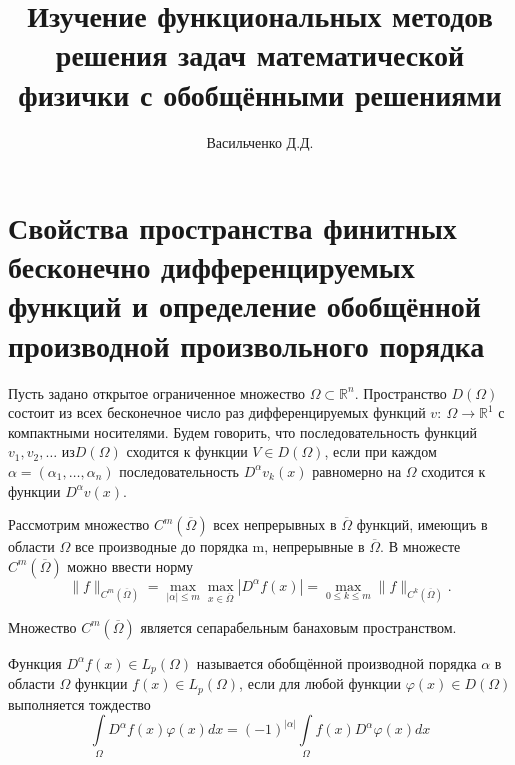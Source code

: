 \documentclass[9pt]{article}
\title{Изучение функциональных методов решения задач математической физички с обобщёнными решениями}
\author{Васильченко Д.Д.}
\date{}
\begin{document}
	\maketitle
	\section{Свойства пространства финитных бесконечно дифференцируемых функций и определение обобщённой производной произвольного порядка}
	
	Пусть задано открытое ограниченное множество $\Omega \subset \mathbb{R}^n$. Пространство $D(\Omega)$ состоит из всех бесконечное число раз дифференцируемых функций $v: \ \Omega \to \mathbb{R}^1$ с компактными носителями. Будем говорить, что последовательность функций $v_1, v_2, \dots$ из$D(\Omega)$ сходится к функции $V \in D(\Omega)$, если при каждом $\alpha = (\alpha_1, \dots, \alpha_n)$ последовательность $D^\alpha v_k(x)$  равномерно на $\Omega$ сходится к функции $D^\alpha v(x)$.
	
	Рассмотрим множество $C^m(\overline{\Omega})$ всех непрерывных в $\overline{\Omega}$ функций, имеющиъ в области $\Omega$ все производные до порядка m, непрерывные в $\overline{\Omega}$. В множесте $C^m(\overline{\Omega})$ можно ввести норму
	\begin{equation*}
		\|f\|_{C^m(\overline{\Omega})} = \max\limits_{|\alpha| \leq m} \max\limits_{x \in \overline{\Omega}} |D^\alpha f(x)| = \max\limits_{0 \leq k \leq m} \|f\|_{C^k(\overline{\Omega})}.
	\end{equation*}

	Множество $C^m(\overline{\Omega})$ является сепарабельным банаховым пространством.
	
	Функция $D^\alpha f(x) \in L_p(\Omega)$ называется обобщённой производной порядка $\alpha$ в области $\Omega$ функции $f(x) \in L_p(\Omega)$, если для любой функции $\varphi(x) \in D(\Omega)$ выполняется тождество
	\begin{equation*}
		\int\limits_{\Omega} D^\alpha f(x) \varphi(x) dx = (-1)^{|\alpha|} \int\limits_{\Omega} f(x) D^\alpha \varphi(x) dx
	\end{equation*}
\end{document}
